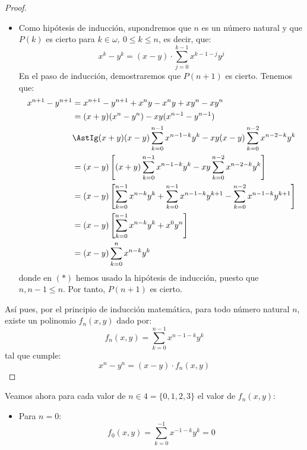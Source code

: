 \begin{ejercicio}
\begin{proof}
\begin{itemize}
            \item Como hipótesis de inducción, supondremos que $n$ es un número natural y que $P(k)$ es cierto para $k\in \omega,~0\leq k\leq n$, es decir, que:
                \begin{equation*}
                    x^k - y^k = (x-y)\cdot \sum_{j=0}^{k-1}x^{k-1-j}y^j
                \end{equation*}
                En el paso de inducción, demostraremos que $P(n+1)$ es cierto. Tenemos que:
                \begin{align*}
                    x^{n+1} - y^{n+1} &= x^{n+1} - y^{n+1} + x^ny -x^ny +xy^n -xy^n \\
                    &= (x+y)(x^n - y^n) -xy(x^{n-1} - y^{n-1}) \\
                    &\AstIg (x+y)(x-y)\sum_{k=0}^{n-1}x^{n-1-k}y^k -xy(x-y)\sum_{k=0}^{n-2}x^{n-2-k}y^k \\
                    &= (x-y)\left[(x+y)\sum_{k=0}^{n-1}x^{n-1-k}y^k - xy\sum_{k=0}^{n-2}x^{n-2-k}y^k\right] \\
                    &= (x-y)\left[\sum_{k=0}^{n-1}x^{n-k}y^k + \sum_{k=0}^{n-1}x^{n-1-k}y^{k+1} - \sum_{k=0}^{n-2}x^{n-1-k}y^{k+1}\right] \\
                    &= (x-y)\left[\sum_{k=0}^{n-1}x^{n-k}y^k + x^0y^n\right] \\
                    &= (x-y)\sum_{k=0}^{n}x^{n-k}y^k
                \end{align*}
                donde en $(\ast)$ hemos usado la hipótesis de inducción, puesto que $n,n-1\leq n$. Por tanto, $P(n+1)$ es cierto.
        \end{itemize}

        Así pues, por el principio de inducción matemática, para todo número natural $n$, existe un polinomio $f_n(x, y)$ dado por:
        \begin{equation*}
            f_n(x, y) = \sum_{k=0}^{n-1}x^{n-1-k}y^k
        \end{equation*}
        tal que cumple:
        \begin{equation*}
            x^n - y^n = (x-y)\cdot f_n(x, y)
        \end{equation*}
    \end{proof}

    Veamos ahora para cada valor de $n\in 4= \{0, 1, 2, 3\}$ el valor de $f_n(x, y)$:
        \begin{itemize}
            \item Para $n=0$:
                \begin{equation*}
                    f_0(x, y) = \sum_{k=0}^{-1}x^{-1-k}y^k = 0
                \end{equation*}


\end{itemize}
\end{ejercicio}
